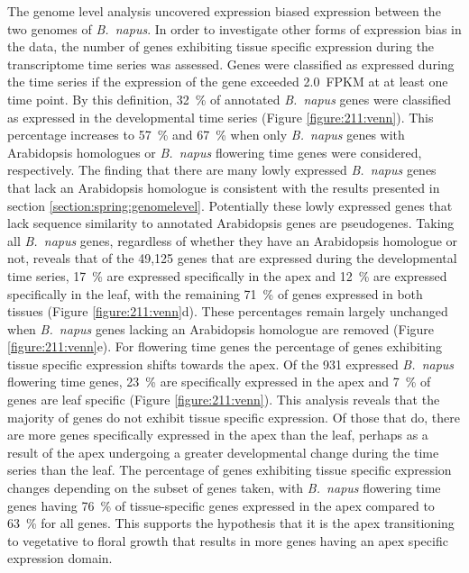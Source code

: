 \documentclass[12pt,]{book}
\begin{document}
The genome level analysis uncovered expression biased expression between
the two genomes of \emph{B.~napus}. In order to investigate other forms
of expression bias in the data, the number of genes exhibiting tissue
specific expression during the transcriptome time series was assessed.
Genes were classified as expressed during the time series if the
expression of the gene exceeded 2.0~FPKM at at least one time point. By
this definition, 32~\% of annotated \emph{B.~napus} genes were
classified as expressed in the developmental time series (Figure
\ref{figure:211:venn}). This percentage increases to 57~\% and 67~\%
when only \emph{B.~napus} genes with Arabidopsis homologues or
\emph{B.~napus} flowering time genes were considered, respectively. The
finding that there are many lowly expressed \emph{B.~napus} genes that
lack an Arabidopsis homologue is consistent with the results presented
in section \ref{section:spring:genomelevel}. Potentially these lowly
expressed genes that lack sequence similarity to annotated Arabidopsis
genes are pseudogenes. Taking all \emph{B.~napus} genes, regardless of
whether they have an Arabidopsis homologue or not, reveals that of the
49,125 genes that are expressed during the developmental time series,
17~\% are expressed specifically in the apex and 12~\% are expressed
specifically in the leaf, with the remaining 71~\% of genes expressed in
both tissues (Figure \ref{figure:211:venn}d). These percentages remain
largely unchanged when \emph{B.~napus} genes lacking an Arabidopsis
homologue are removed (Figure \ref{figure:211:venn}e). For flowering
time genes the percentage of genes exhibiting tissue specific expression
shifts towards the apex. Of the 931 expressed \emph{B.~napus} flowering
time genes, 23~\% are specifically expressed in the apex and 7~\% of
genes are leaf specific (Figure \ref{figure:211:venn}). This analysis
reveals that the majority of genes do not exhibit tissue specific
expression. Of those that do, there are more genes specifically
expressed in the apex than the leaf, perhaps as a result of the apex
undergoing a greater developmental change during the time series than
the leaf. The percentage of genes exhibiting tissue specific expression
changes depending on the subset of genes taken, with \emph{B.~napus}
flowering time genes having 76~\% of tissue-specific genes expressed in
the apex compared to 63~\% for all genes. This supports the hypothesis
that it is the apex transitioning to vegetative to floral growth that
results in more genes having an apex specific expression domain.
\end{document}
